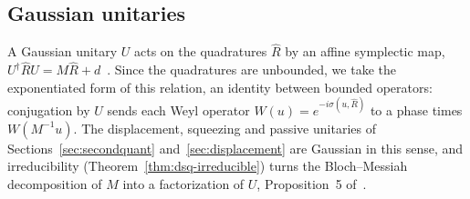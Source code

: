 \providecommand{\cU}{\mathcal U}
\providecommand{\cV}{\mathcal V}
\providecommand{\sU}{\mathsf U}
\providecommand{\sS}{\mathsf S}
\providecommand{\dom}{\operatorname{dom}}
\providecommand{\Sp}{\mathrm{Sp}(2N,\R)}
\providecommand{\Un}{\mathrm{U}(N)}
\providecommand{\Gs}{\Gamma_s(\iota)}
\providecommand{\Rh}{\hat R}
\providecommand{\Qd}{\mathcal Q}
\begin{veteenv}
\setlength{\emergencystretch}{3em}
\section{Gaussian unitaries}\label{sec:gaussunitary}

A Gaussian unitary $U$ acts on the quadratures $\Rh$ by an affine symplectic map, $U^\dagger\Rh U=M\Rh+d$~\cite[(A3)]{tjoacirac}.
Since the quadratures are unbounded, we take the exponentiated form of this relation, an identity between bounded operators:
conjugation by $U$ sends each Weyl operator $W(u)=e^{-i\sigma(u,\Rh)}$ to a phase times $W(M^{-1}u)$. The displacement,
squeezing and passive unitaries of Sections~\ref{sec:secondquant} and~\ref{sec:displacement} are Gaussian in this sense, and
irreducibility (Theorem~\ref{thm:dsq-irreducible}) turns the Bloch--Messiah decomposition of $M$ into a factorization of $U$,
Proposition~5 of~\cite{tjoacirac}.


\end{veteenv}
